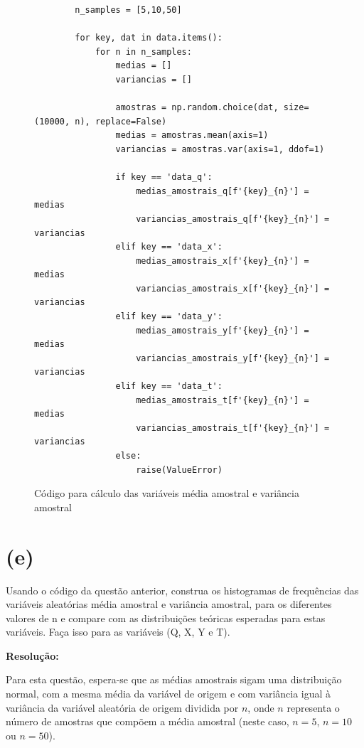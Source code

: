 \documentclass[]{abntex2}
\begin{document}
\begin{figure}[H]
    \centering
    \begin{minipage}{\textwidth}
    \begin{lstlisting}
        n_samples = [5,10,50]
        
        for key, dat in data.items():
            for n in n_samples:
                medias = []
                variancias = []
        
                amostras = np.random.choice(dat, size=(10000, n), replace=False)
                medias = amostras.mean(axis=1)
                variancias = amostras.var(axis=1, ddof=1)
        
                if key == 'data_q':
                    medias_amostrais_q[f'{key}_{n}'] = medias
                    variancias_amostrais_q[f'{key}_{n}'] = variancias
                elif key == 'data_x':
                    medias_amostrais_x[f'{key}_{n}'] = medias
                    variancias_amostrais_x[f'{key}_{n}'] = variancias
                elif key == 'data_y':
                    medias_amostrais_y[f'{key}_{n}'] = medias
                    variancias_amostrais_y[f'{key}_{n}'] = variancias
                elif key == 'data_t':
                    medias_amostrais_t[f'{key}_{n}'] = medias
                    variancias_amostrais_t[f'{key}_{n}'] = variancias
                else:
                    raise(ValueError)
    \end{lstlisting}   
    \end{minipage} 
    \caption{Código para cálculo das variáveis média amostral e variância amostral}
    \label{fig:cod}
\end{figure}


\section*{\textbf{(e)}}

\noindent Usando o código da questão anterior, construa os histogramas de frequências das
variáveis aleatórias média amostral e variância amostral, para os diferentes valores de n e compare com as distribuições teóricas esperadas para estas variáveis.
Faça isso para as variáveis (Q, X, Y e T).

\textbf{Resolução:}

Para esta questão, espera-se que as médias amostrais sigam uma distribuição normal, com a mesma média da variável de origem e com variância igual à variância da variável aleatória de origem dividida por \( n \), onde \( n \) representa o número de amostras que compõem a média amostral (neste caso, \( n = 5 \), \( n = 10 \) ou \( n = 50 \)). 
\end{document}
